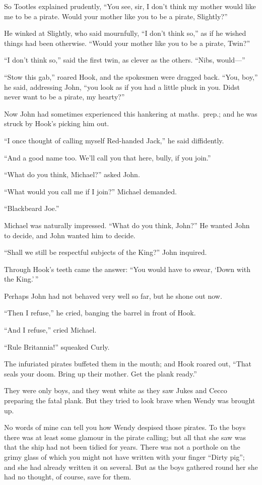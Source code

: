 So Tootles explained prudently, ``You see, sir, I don't think my mother
would like me to be a pirate. Would your mother like you to be a
pirate, Slightly?''

He winked at Slightly, who said mournfully, ``I don't think so,'' as if
he wished things had been otherwise. ``Would your mother like you to be
a pirate, Twin?''

``I don't think so,'' said the first twin, as clever as the others.
``Nibs, would---''

``Stow this gab,'' roared Hook, and the spokesmen were dragged back.
``You, boy,'' he said, addressing John, ``you look as if you had a little
pluck in you. Didst never want to be a pirate, my hearty?''

Now John had sometimes experienced this hankering at maths.\ prep.; and
he was struck by Hook's picking him out.

``I once thought of calling myself Red-handed Jack,'' he said
diffidently.

``And a good name too. We'll call you that here, bully, if you join.''

``What do you think, Michael?'' asked John.

``What would you call me if I join?'' Michael demanded.

``Blackbeard Joe.''

Michael was naturally impressed. ``What do you think, John?'' He wanted
John to decide, and John wanted him to decide.

``Shall we still be respectful subjects of the King?'' John inquired.

Through Hook's teeth came the answer: ``You would have to swear, ‘Down
with the King.'\,''

Perhaps John had not behaved very well so far, but he shone out now.

``Then I refuse,'' he cried, banging the barrel in front of Hook.

``And I refuse,'' cried Michael.

``Rule Britannia!'' squeaked Curly.

The infuriated pirates buffeted them in the mouth; and Hook roared out,
``That seals your doom. Bring up their mother. Get the plank ready.''

They were only boys, and they went white as they saw Jukes and Cecco
preparing the fatal plank. But they tried to look brave when Wendy was
brought up.

No words of mine can tell you how Wendy despised those pirates. To the
boys there was at least some glamour in the pirate calling; but all
that she saw was that the ship had not been tidied for years. There was
not a porthole on the grimy glass of which you might not have written
with your finger ``Dirty pig''; and she had already written it on
several. But as the boys gathered round her she had no thought, of
course, save for them.

